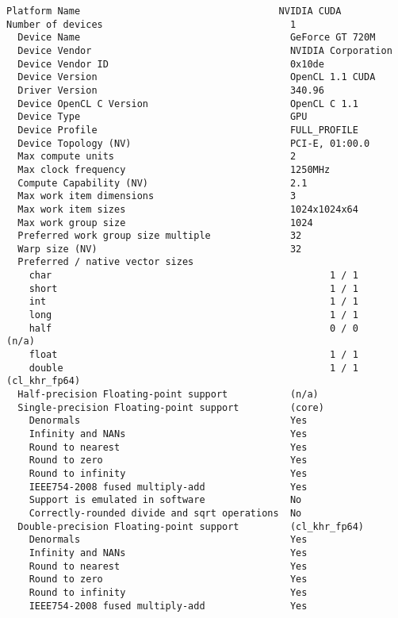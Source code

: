 \documentclass{article}
\begin{document}
\begin{lstlisting}[language={}]
  Platform Name                                   NVIDIA CUDA
Number of devices                                 1
  Device Name                                     GeForce GT 720M
  Device Vendor                                   NVIDIA Corporation
  Device Vendor ID                                0x10de
  Device Version                                  OpenCL 1.1 CUDA
  Driver Version                                  340.96
  Device OpenCL C Version                         OpenCL C 1.1 
  Device Type                                     GPU
  Device Profile                                  FULL_PROFILE
  Device Topology (NV)                            PCI-E, 01:00.0
  Max compute units                               2
  Max clock frequency                             1250MHz
  Compute Capability (NV)                         2.1
  Max work item dimensions                        3
  Max work item sizes                             1024x1024x64
  Max work group size                             1024
  Preferred work group size multiple              32
  Warp size (NV)                                  32
  Preferred / native vector sizes                 
    char                                                 1 / 1       
    short                                                1 / 1       
    int                                                  1 / 1       
    long                                                 1 / 1       
    half                                                 0 / 0        (n/a)
    float                                                1 / 1       
    double                                               1 / 1        (cl_khr_fp64)
  Half-precision Floating-point support           (n/a)
  Single-precision Floating-point support         (core)
    Denormals                                     Yes
    Infinity and NANs                             Yes
    Round to nearest                              Yes
    Round to zero                                 Yes
    Round to infinity                             Yes
    IEEE754-2008 fused multiply-add               Yes
    Support is emulated in software               No
    Correctly-rounded divide and sqrt operations  No
  Double-precision Floating-point support         (cl_khr_fp64)
    Denormals                                     Yes
    Infinity and NANs                             Yes
    Round to nearest                              Yes
    Round to zero                                 Yes
    Round to infinity                             Yes
    IEEE754-2008 fused multiply-add               Yes

\end{lstlisting}
\end{document}

